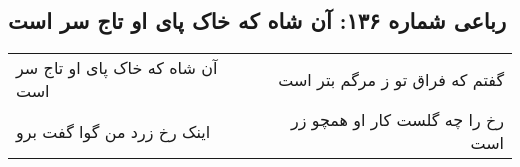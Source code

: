 \begin{center}
\section*{رباعی شماره ۱۳۶: آن شاه که خاک پای او تاج سر است}
\label{sec:0136}
\begin{longtable}{l p{0.5cm} r}
آن شاه که خاک پای او تاج سر است
&&
گفتم که فراق تو ز مرگم بتر است
\\
اینک رخ زرد من گوا گفت برو
&&
رخ را چه گلست کار او همچو زر است
\\
\end{longtable}
\end{center}
